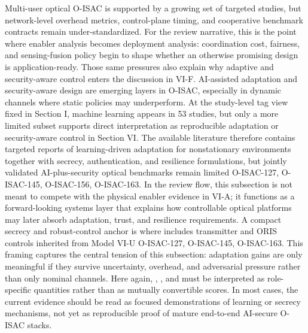 {} Multi-user optical O-ISAC is supported by a growing set of targeted studies, but network-level overhead metrics, control-plane timing, and cooperative benchmark contracts remain under-standardized. For the review narrative, this is the point where enabler analysis becomes deployment analysis: coordination cost, fairness, and sensing-fusion policy begin to shape whether an otherwise promising design is application-ready. Those same pressures also explain why adaptive and security-aware control enters the discussion in VI-F.\markdownRendererInterblockSeparator
{}
\markdownRendererSectionEnd \markdownRendererSectionBegin
{}\markdownRendererInterblockSeparator
{}AI-assisted adaptation and security-aware design are emerging layers in O-ISAC, especially in dynamic channels where static policies may underperform. At the study-level tag view fixed in Section I, machine learning appears in 53 studies, but only a more limited subset supports direct interpretation as reproducible adaptation or security-aware control in Section VI. The available literature therefore contains targeted reports of learning-driven adaptation for nonstationary environments together with secrecy, authentication, and resilience formulations, but jointly validated AI-plus-security optical benchmarks remain limited O-ISAC-127, O-ISAC-145, O-ISAC-156, O-ISAC-163. In the review flow, this subsection is not meant to compete with the physical enabler evidence in VI-A; it functions as a forward-looking systems layer that explains how controllable optical platforms may later absorb adaptation, trust, and resilience requirements.\markdownRendererParagraphSeparator
{}A compact secrecy and robust-control anchor is\markdownRendererParagraphSeparator
{}\markdownRendererSoftLineBreak
{}\markdownRendererSoftLineBreak
{}\markdownRendererParagraphSeparator
{}where  includes transmitter and ORIS controls inherited from Model VI-U O-ISAC-127, O-ISAC-145, O-ISAC-163. This framing captures the central tension of this subsection: adaptation gains are only meaningful if they survive uncertainty, overhead, and adversarial pressure rather than only nominal channels. Here again, , , and  must be interpreted as role-specific quantities rather than as mutually convertible scores. In most cases, the current evidence should be read as focused demonstrations of learning or secrecy mechanisms, not yet as reproducible proof of mature end-to-end AI-secure O-ISAC stacks.\markdownRendererParagraphSeparator
